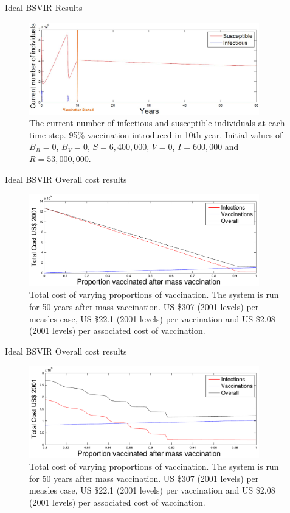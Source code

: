\documentclass{beamer}
\begin{document}
\begin{frame} {Ideal BSVIR} {Results}
\begin{figure}
\centering
\includegraphics[width=100mm]{figidealbsvir95.jpg}
\caption{The current number of infectious and susceptible individuals at each time step. 95\% vaccination introduced in 10th year. Initial values of  $B_R=0$, $B_V=0$, $S=6,400,000$, $V=0$, $I=600,000$ and $R=53,000,000$.}
\end{figure}
\end{frame}

\begin{frame} {Ideal BSVIR} {Overall cost results}
\begin{figure}
\centering
\includegraphics[width=100mm]{figproportionidealBSVIRcost0to100}
\caption{Total cost of varying proportions of vaccination. The system is run for 50 years after mass vaccination. US \$307 (2001 levels) per measles case, US \$22.1 (2001 levels) per vaccination and US \$2.08 (2001 levels) per associated cost of vaccination.}
\end{figure}
\end{frame}

\begin{frame} {Ideal BSVIR} {Overall cost results}
\begin{figure}
\centering
\includegraphics[width=100mm]{figproportionidealBSVIRcost80to100}
\caption{Total cost of varying proportions of vaccination. The system is run for 50 years after mass vaccination. US \$307 (2001 levels) per measles case, US \$22.1 (2001 levels) per vaccination and US \$2.08 (2001 levels) per associated cost of vaccination.}
\end{figure}
\end{frame}
\end{document}
